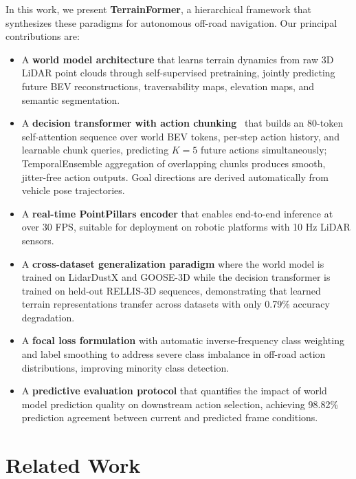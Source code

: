 \documentclass[journal]{IEEEtran}
\begin{document}
In this work, we present \textbf{TerrainFormer}, a hierarchical framework that synthesizes these paradigms for autonomous off-road navigation. Our principal contributions are:

\begin{itemize}
    \item A \textbf{world model architecture} that learns terrain dynamics from raw 3D LiDAR point clouds through self-supervised pretraining, jointly predicting future BEV reconstructions, traversability maps, elevation maps, and semantic segmentation.
    \item A \textbf{decision transformer with action chunking}~\cite{zhao2023act} that builds an 80-token self-attention sequence over world BEV tokens, per-step action history, and learnable chunk queries, predicting $K{=}5$ future actions simultaneously; TemporalEnsemble aggregation of overlapping chunks produces smooth, jitter-free action outputs. Goal directions are derived automatically from vehicle pose trajectories.
    \item A \textbf{real-time PointPillars encoder} that enables end-to-end inference at over 30 FPS, suitable for deployment on robotic platforms with 10 Hz LiDAR sensors.
    \item A \textbf{cross-dataset generalization paradigm} where the world model is trained on LidarDustX \cite{lidardust} and GOOSE-3D \cite{goose2024} while the decision transformer is trained on held-out RELLIS-3D sequences, demonstrating that learned terrain representations transfer across datasets with only 0.79\% accuracy degradation.
    \item A \textbf{focal loss formulation} with automatic inverse-frequency class weighting and label smoothing to address severe class imbalance in off-road action distributions, improving minority class detection.
    \item A \textbf{predictive evaluation protocol} that quantifies the impact of world model prediction quality on downstream action selection, achieving 98.82\% prediction agreement between current and predicted frame conditions.
\end{itemize}

\section{Related Work}
\label{sec:related_work}
\end{document}
